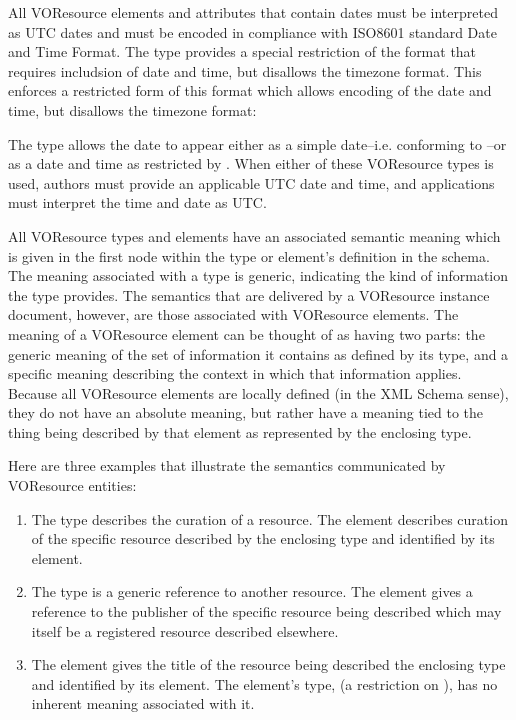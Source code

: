 \documentclass[11pt,a4paper]{ivoa}
\begin{document}
All VOResource elements and attributes that contain dates must be
interpreted as UTC dates and must be encoded in compliance with ISO8601
standard Date and Time Format.  The  type
provides a special restriction of the format that requires includsion of
date and time, but disallows the timezone format.  This enforces a
restricted form of this format which allows encoding of the date and
time, but disallows the timezone format:



The  type allows the date to appear either
as a simple date--i.e. conforming to --or as a
date and time as restricted by .  
When either of these VOResource types is used, authors must provide an
applicable UTC date and time, and applications must interpret the time
and date as UTC. 

All VOResource types and elements have an associated semantic meaning
which is given in the first 
node within the type or element's definition in the schema.  The
meaning associated with a type is generic, indicating the kind of
information the type provides.  The semantics that are delivered by a
VOResource instance document, however, are those associated with
VOResource elements.  The meaning of a VOResource element can be
thought of as having two parts:  the generic meaning of the set of
information it contains as defined by its type, and a specific meaning
describing the context in which that information applies.  Because all
VOResource elements are locally defined (in the XML Schema
sense), they do not have an absolute meaning, but rather have a
meaning tied to the thing being described by that element as
represented by the enclosing type.  

Here are three examples that illustrate the semantics communicated by
VOResource entities:

\begin{enumerate}
\item The  type describes the curation of a
       resource.  The  element
       describes curation of the specific resource described by the
       enclosing  type and identified by its
        element. 

  \item The  type is a generic reference to
       another resource.  The  element
       gives a reference to the publisher of the specific resource being
       described which may itself be a registered resource described
       elsewhere.  

  \item The  element gives the title of
       the resource being described the enclosing
        type and identified by its
        element.  The
        element's type,
        (a restriction on
       ), has no inherent meaning associated
       with it.   
\end{enumerate}
\end{document}

